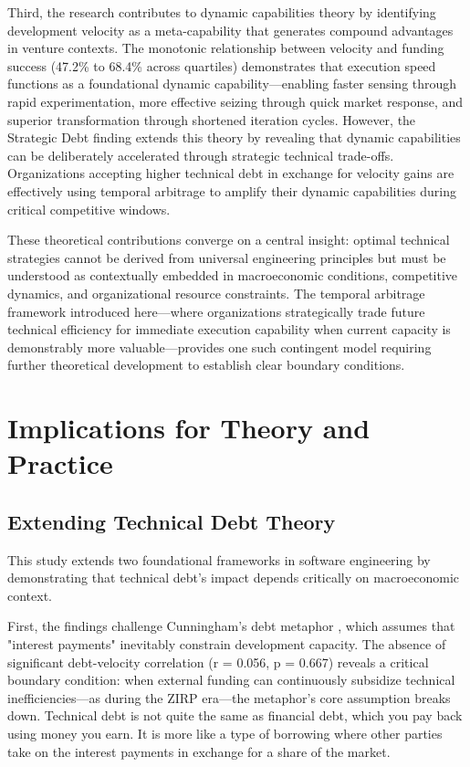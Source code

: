 Third, the research contributes to dynamic capabilities theory \citep{teece1997dynamic} by identifying development velocity as a meta-capability that generates compound advantages in venture contexts. The monotonic relationship between velocity and funding success (47.2\% to 68.4\% across quartiles) demonstrates that execution speed functions as a foundational dynamic capability—enabling faster sensing through rapid experimentation, more effective seizing through quick market response, and superior transformation through shortened iteration cycles. However, the Strategic Debt finding extends this theory by revealing that dynamic capabilities can be deliberately accelerated through strategic technical trade-offs. Organizations accepting higher technical debt in exchange for velocity gains are effectively using temporal arbitrage to amplify their dynamic capabilities during critical competitive windows.

These theoretical contributions converge on a central insight: optimal technical strategies cannot be derived from universal engineering principles but must be understood as contextually embedded in macroeconomic conditions, competitive dynamics, and organizational resource constraints. The temporal arbitrage framework introduced here—where organizations strategically trade future technical efficiency for immediate execution capability when current capacity is demonstrably more valuable—provides one such contingent model requiring further theoretical development to establish clear boundary conditions.

\section{Implications for Theory and Practice}

\subsection{Extending Technical Debt Theory}

This study extends two foundational frameworks in software engineering by demonstrating that technical debt's impact depends critically on macroeconomic context.

First, the findings challenge Cunningham's debt metaphor \citep{cunningham1992wycash}, which assumes that "interest payments" inevitably constrain development capacity. The absence of significant debt-velocity correlation (r = 0.056, p = 0.667) reveals a critical boundary condition: when external funding can continuously subsidize technical inefficiencies—as during the \ac{ZIRP} era—the metaphor's core assumption breaks down. Technical debt is not quite the same as financial debt, which you pay back using money you earn. It is more like a type of borrowing where other parties take on the interest payments in exchange for a share of the market.

